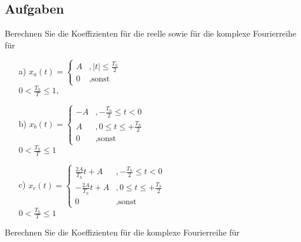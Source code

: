 \documentclass[11pt,a4paper,DIV=12]{scrartcl}
\begin{document}
\subsection*{Aufgaben}
%
Berechnen Sie die Koeffizienten für die reelle sowie für die komplexe Fourierreihe für
%
%
\begin{itemize}
	\item[a) ] $x_{a}(t)=
				\begin{cases}
					A &,|t|\leq\frac{T_h}{2}\\
					0 &,\text{sonst}
				\end{cases}$\\
				$0<\frac{T_h}{T}\leq 1,$
	\item[b) ] $x_{b}(t)=
				\begin{cases}
					-A &,-\frac{T_h}{2}\leq t < 0\\
					A &,0 \leq t \leq +\frac{T_h}{2}\\
					0 &,\text{sonst}
				\end{cases}$\\
				$0 < \frac{T_h}{T} \leq 1$
	\item[c) ] $x_c(t)=
				\begin{cases}
					\frac{2A}{T_h}t+A&,-\frac{T_h}{2}\leq t <0\\
					-\frac{2A}{T_h}t+A&,0\leq t \leq +\frac{T_h}{2}\\
					0&,\text{sonst}
				\end{cases}$\\
				$0<\frac{T_h}{T}\leq 1$
\end{itemize}
%
%
Berechnen Sie die Koeffizienten für die komplexe Fourierreihe für
%
\end{document}

